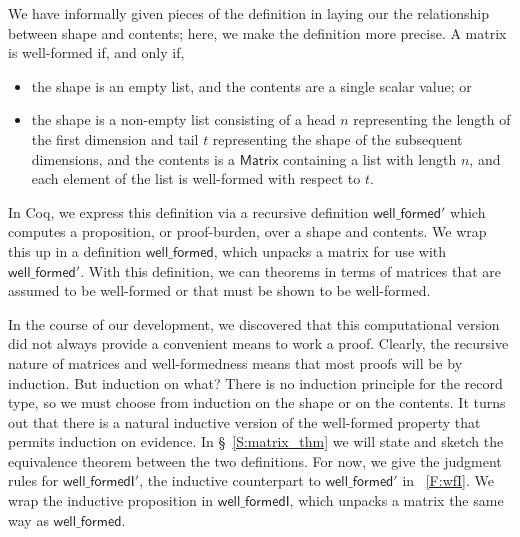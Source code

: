 \documentclass[11pt,conference]{IEEEtran}
\newcommand{\func}[1]{\mathsf{#1}}
\theoremstyle{plain} %
\theoremstyle{definition}
\theoremstyle{remark}
\begin{document}
We have informally given pieces of the definition in laying our the relationship
between shape and contents; here, we make the definition more precise. A matrix
is well-formed if, and only if,
\begin{itemize}
    \item the shape is an empty list, and the contents are a single scalar value;
        or
    \item the shape is a non-empty list consisting of a head \(n\) representing
        the length of the first dimension and tail \(t\) representing the shape
        of the subsequent dimensions, and the contents is a \(\func{Matrix}\)
        containing a list with length \(n\), and each element of the list is
        well-formed with respect to \(t\).
\end{itemize}
In Coq, we express this definition via a recursive definition
\(\func{well\_formed'}\) which computes a proposition, or proof-burden, over a
shape and contents. We wrap this up in a definition \(\func{well\_formed}\),
which unpacks a matrix for use with \(\func{well\_formed'}\). With this
definition, we can theorems in terms of matrices that are assumed to be
well-formed or that must be shown to be well-formed.

In the course of our development, we discovered that this computational version
did not always provide a convenient means to work a proof. Clearly, the
recursive nature of matrices and well-formedness means that most proofs will be
by induction. But induction on what? There is no induction principle for the
record type, so we must choose from induction on the shape or on the contents.
It turns out that there is a natural inductive version of the well-formed
property that permits induction on evidence. In \S~\ref{S:matrix_thm} we will
state and sketch the equivalence theorem between the two definitions. For now,
we give the judgment rules for \(\func{well\_formedI'}\), the inductive
counterpart to \(\func{well\_formed'}\) in \figurename~\ref{F:wfI}. We wrap the
inductive proposition in \(\func{well\_formedI}\), which unpacks a matrix the
same way as \(\func{well\_formed}\).
\end{document}
